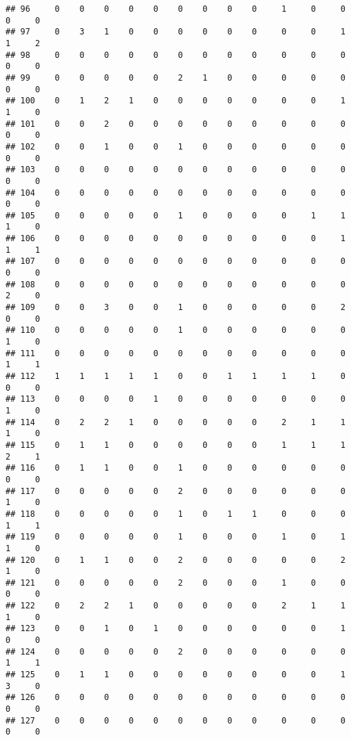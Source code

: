 \documentclass[
]{article}
\begin{document}
\begin{verbatim}
## 96     0    0    0    0    0    0    0    0    0     1     0     0     0     0
## 97     0    3    1    0    0    0    0    0    0     0     0     1     1     2
## 98     0    0    0    0    0    0    0    0    0     0     0     0     0     0
## 99     0    0    0    0    0    2    1    0    0     0     0     0     0     0
## 100    0    1    2    1    0    0    0    0    0     0     0     1     1     0
## 101    0    0    2    0    0    0    0    0    0     0     0     0     0     0
## 102    0    0    1    0    0    1    0    0    0     0     0     0     0     0
## 103    0    0    0    0    0    0    0    0    0     0     0     0     0     0
## 104    0    0    0    0    0    0    0    0    0     0     0     0     0     0
## 105    0    0    0    0    0    1    0    0    0     0     1     1     1     0
## 106    0    0    0    0    0    0    0    0    0     0     0     1     1     1
## 107    0    0    0    0    0    0    0    0    0     0     0     0     0     0
## 108    0    0    0    0    0    0    0    0    0     0     0     0     2     0
## 109    0    0    3    0    0    1    0    0    0     0     0     2     0     0
## 110    0    0    0    0    0    1    0    0    0     0     0     0     1     0
## 111    0    0    0    0    0    0    0    0    0     0     0     0     1     1
## 112    1    1    1    1    1    0    0    1    1     1     1     0     0     0
## 113    0    0    0    0    1    0    0    0    0     0     0     0     1     0
## 114    0    2    2    1    0    0    0    0    0     2     1     1     1     0
## 115    0    1    1    0    0    0    0    0    0     1     1     1     2     1
## 116    0    1    1    0    0    1    0    0    0     0     0     0     0     0
## 117    0    0    0    0    0    2    0    0    0     0     0     0     1     0
## 118    0    0    0    0    0    1    0    1    1     0     0     0     1     1
## 119    0    0    0    0    0    1    0    0    0     1     0     1     1     0
## 120    0    1    1    0    0    2    0    0    0     0     0     2     1     0
## 121    0    0    0    0    0    2    0    0    0     1     0     0     0     0
## 122    0    2    2    1    0    0    0    0    0     2     1     1     1     0
## 123    0    0    1    0    1    0    0    0    0     0     0     1     0     0
## 124    0    0    0    0    0    2    0    0    0     0     0     0     1     1
## 125    0    1    1    0    0    0    0    0    0     0     0     1     3     0
## 126    0    0    0    0    0    0    0    0    0     0     0     0     0     0
## 127    0    0    0    0    0    0    0    0    0     0     0     0     0     0

\end{verbatim}
\end{document}
